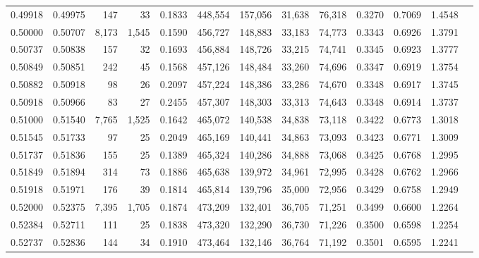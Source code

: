 \begin{tabular}{rrrrrrrrrrrrr}
0.49918 & 0.49975 &    147 &    33 &                                     0.1833 & 448,554 & 157,056 &  31,638 &  76,318 & 0.3270 & 0.7069 & 1.4548 \\
0.50000 & 0.50707 &  8,173 & 1,545 &                                     0.1590 & 456,727 & 148,883 &  33,183 &  74,773 & 0.3343 & 0.6926 & 1.3791 \\
0.50737 & 0.50838 &    157 &    32 &                                     0.1693 & 456,884 & 148,726 &  33,215 &  74,741 & 0.3345 & 0.6923 & 1.3777 \\
0.50849 & 0.50851 &    242 &    45 &                                     0.1568 & 457,126 & 148,484 &  33,260 &  74,696 & 0.3347 & 0.6919 & 1.3754 \\
0.50882 & 0.50918 &     98 &    26 &                                     0.2097 & 457,224 & 148,386 &  33,286 &  74,670 & 0.3348 & 0.6917 & 1.3745 \\
0.50918 & 0.50966 &     83 &    27 &                                     0.2455 & 457,307 & 148,303 &  33,313 &  74,643 & 0.3348 & 0.6914 & 1.3737 \\
0.51000 & 0.51540 &  7,765 & 1,525 &                                     0.1642 & 465,072 & 140,538 &  34,838 &  73,118 & 0.3422 & 0.6773 & 1.3018 \\
0.51545 & 0.51733 &     97 &    25 &                                     0.2049 & 465,169 & 140,441 &  34,863 &  73,093 & 0.3423 & 0.6771 & 1.3009 \\
0.51737 & 0.51836 &    155 &    25 &                                     0.1389 & 465,324 & 140,286 &  34,888 &  73,068 & 0.3425 & 0.6768 & 1.2995 \\
0.51849 & 0.51894 &    314 &    73 &                                     0.1886 & 465,638 & 139,972 &  34,961 &  72,995 & 0.3428 & 0.6762 & 1.2966 \\
0.51918 & 0.51971 &    176 &    39 &                                     0.1814 & 465,814 & 139,796 &  35,000 &  72,956 & 0.3429 & 0.6758 & 1.2949 \\
0.52000 & 0.52375 &  7,395 & 1,705 &                                     0.1874 & 473,209 & 132,401 &  36,705 &  71,251 & 0.3499 & 0.6600 & 1.2264 \\
0.52384 & 0.52711 &    111 &    25 &                                     0.1838 & 473,320 & 132,290 &  36,730 &  71,226 & 0.3500 & 0.6598 & 1.2254 \\
0.52737 & 0.52836 &    144 &    34 &                                     0.1910 & 473,464 & 132,146 &  36,764 &  71,192 & 0.3501 & 0.6595 & 1.2241 \\

\end{tabular}
